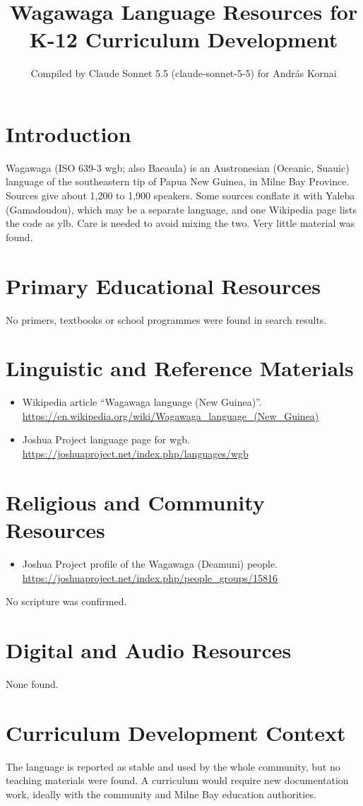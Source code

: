 \documentclass[12pt]{article}
\title{Wagawaga Language Resources for K-12 Curriculum Development}
\author{Compiled by Claude Sonnet 5.5 (claude-sonnet-5-5) for Andr\'as Kornai}
\date{}
\begin{document}
\maketitle

\section{Introduction}
Wagawaga (ISO 639-3 wgb; also Baeaula) is an Austronesian (Oceanic, Suauic) language of the southeastern tip of Papua New Guinea, in Milne Bay Province. Sources give about 1,200 to 1,900 speakers. Some sources conflate it with Yaleba (Gamadoudou), which may be a separate language, and one Wikipedia page lists the code as ylb. Care is needed to avoid mixing the two. Very little material was found.

\section{Primary Educational Resources}
No primers, textbooks or school programmes were found in search results.

\section{Linguistic and Reference Materials}
\begin{itemize}
\item Wikipedia article ``Wagawaga language (New Guinea)''. \url{https://en.wikipedia.org/wiki/Wagawaga_language_(New_Guinea)}
\item Joshua Project language page for wgb. \url{https://joshuaproject.net/index.php/languages/wgb}
\end{itemize}

\section{Religious and Community Resources}
\begin{itemize}
\item Joshua Project profile of the Wagawaga (Deamuni) people. \url{https://joshuaproject.net/index.php/people_groups/15816}
\end{itemize}
No scripture was confirmed.

\section{Digital and Audio Resources}
None found.

\section{Curriculum Development Context}
The language is reported as stable and used by the whole community, but no teaching materials were found. A curriculum would require new documentation work, ideally with the community and Milne Bay education authorities.
\end{document}
